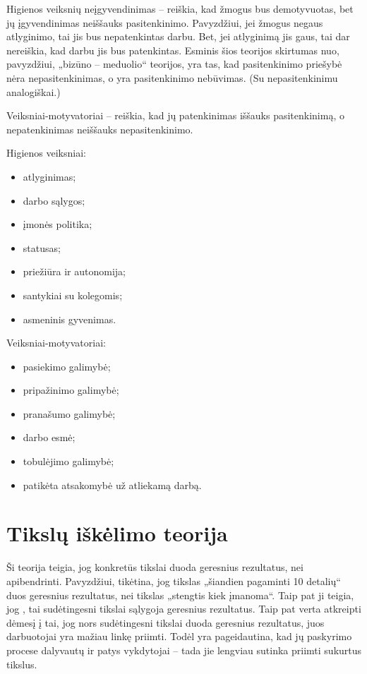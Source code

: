 Higienos veiksnių neįgyvendinimas – reiškia, kad žmogus bus demotyvuotas, 
bet jų įgyvendinimas neiššauks pasitenkinimo. Pavyzdžiui, jei žmogus
negaus atlyginimo, tai jis bus nepatenkintas darbu. Bet, jei atlyginimą
jis gaus, tai dar nereiškia, kad darbu jis bus patenkintas.
Esminis šios teorijos skirtumas nuo, pavyzdžiui, „bizūno – meduolio“
teorijos, yra tas, kad pasitenkinimo priešybė nėra nepasitenkinimas,
o yra pasitenkinimo nebūvimas. (Su nepasitenkinimu analogiškai.)

Veiksniai-motyvatoriai – reiškia, kad jų patenkinimas iššauks pasitenkinimą,
o nepatenkinimas neiššauks nepasitenkinimo.

Higienos veiksniai:
\begin{itemize}
  \item atlyginimas;
  \item darbo sąlygos;
  \item įmonės politika;
  \item statusas;
  \item priežiūra ir autonomija;
  \item santykiai su kolegomis;
  \item asmeninis gyvenimas.
\end{itemize}

Veiksniai-motyvatoriai:
\begin{itemize}
  \item pasiekimo galimybė;
  \item pripažinimo galimybė;
  \item pranašumo galimybė;
  \item darbo esmė;
  \item tobulėjimo galimybė;
  \item patikėta atsakomybė už atliekamą darbą.
\end{itemize}

\section{Tikslų iškėlimo teorija}

Ši teorija teigia, jog konkretūs tikslai duoda geresnius rezultatus,
nei apibendrinti. Pavyzdžiui, tikėtina, jog tikslas „šiandien
pagaminti 10 detalių“ duos geresnius rezultatus, nei tikslas
„stengtis kiek įmanoma“. Taip pat ji teigia, jog , tai sudėtingesni tikslai sąlygoja geresnius
rezultatus. Taip pat verta atkreipti dėmesį į tai, jog nors
sudėtingesni tikslai duoda geresnius rezultatus, juos darbuotojai
yra mažiau linkę priimti. Todėl yra pageidautina, kad jų paskyrimo
procese dalyvautų ir patys vykdytojai – tada jie lengviau sutinka
priimti sukurtus tikslus.

